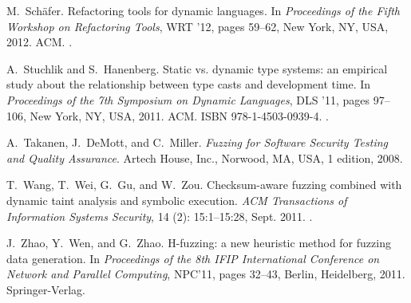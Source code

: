 \documentclass[10pt]{sigplanconf}
\begin{document}
\begin{thebibliography}{35}
M.~Sch\"{a}fer.
\newblock Refactoring tools for dynamic languages.
\newblock In \emph{Proceedings of the Fifth Workshop on Refactoring Tools}, WRT
  '12, pages 59--62, New York, NY, USA, 2012. ACM.
\newblock {}.

A.~Stuchlik and S.~Hanenberg.
\newblock Static vs. dynamic type systems: an empirical study about the
  relationship between type casts and development time.
\newblock In \emph{Proceedings of the 7th Symposium on Dynamic Languages}, DLS
  '11, pages 97--106, New York, NY, USA, 2011. ACM.
\newblock ISBN 978-1-4503-0939-4.
\newblock {}.

A.~Takanen, J.~DeMott, and C.~Miller.
\newblock \emph{Fuzzing for Software Security Testing and Quality Assurance}.
\newblock Artech House, Inc., Norwood, MA, USA, 1 edition, 2008.

T.~Wang, T.~Wei, G.~Gu, and W.~Zou.
\newblock Checksum-aware fuzzing combined with dynamic taint analysis and
  symbolic execution.
\newblock \emph{ACM Transactions of Information Systems Security}, 14
  (2): 15:1--15:28, Sept. 2011.
\newblock {}.

J.~Zhao, Y.~Wen, and G.~Zhao.
\newblock H-fuzzing: a new heuristic method for fuzzing data generation.
\newblock In \emph{Proceedings of the 8th IFIP International Conference on
  Network and Parallel Computing}, NPC'11, pages 32--43, Berlin, Heidelberg,
  2011. Springer-Verlag.

\end{thebibliography}
\end{document}

